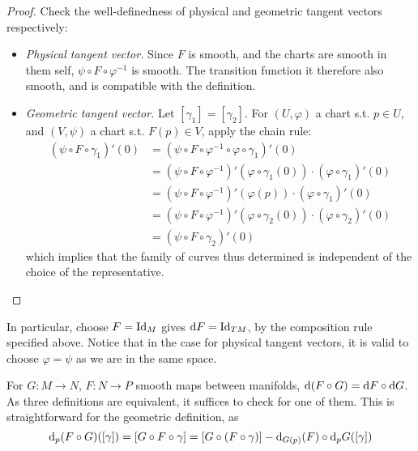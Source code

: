 \documentclass{article}
\begin{document}
\begin{proof}
    Check the well-definedness of physical and geometric tangent vectors respectively:
    \begin{itemize}
        \item \emph{Physical tangent vector.} Since $F$ is smooth, and the charts are smooth in them self, $\psi \circ F \circ \varphi^{-1}$ is smooth. The transition function it therefore also smooth, and is compatible with the definition.
        \item \emph{Geometric tangent vector.} Let $[\gamma_1] = [\gamma_2]$. For $(U, \varphi)$ a chart s.t. $p \in U$, and $(V, \psi)$ a chart s.t. $F(p) \in V$, apply the chain rule:
        \begin{align*}
            (\psi \circ F \circ \gamma_1)'(0)
            & = (\psi \circ F \circ \varphi^{-1} \circ \varphi \circ \gamma_1)'(0) \\
            & = (\psi \circ F \circ \varphi^{-1})'(\varphi \circ \gamma_1(0)) \cdot (\varphi \circ \gamma_1)'(0) \\
            & = (\psi \circ F \circ \varphi^{-1})'(\varphi(p)) \cdot (\varphi \circ \gamma_1)'(0) \\
            & = (\psi \circ F \circ \varphi^{-1})'(\varphi \circ \gamma_2(0)) \cdot (\varphi \circ \gamma_2)'(0) \\
            & = (\psi \circ F \circ \gamma_2)'(0)
        \end{align*}
        which implies that the family of curves thus determined is independent of the choice of the representative. 
    \end{itemize}
\end{proof}

\begin{remark}
    In particular, choose $F = \mathrm{Id}_M$ gives $\mathrm{d} F = \mathrm{Id}_{TM}$, by the composition rule specified above. Notice that in the case for physical tangent vectors, it is valid to choose $\varphi = \psi$ as we are in the same space.
\end{remark}

\begin{remark}
    For $G: M \to N$, $F : N \to P$ smooth maps between manifolds, $\mathrm{d} (F \circ G) = \mathrm{d} F \circ \mathrm{d} G$. As three definitions are equivalent, it suffices to check for one of them. This is straightforward for the geometric definition, as
    \[
        \mathrm{d}_p (F \circ G)([\gamma]) = [G \circ F \circ \gamma] = [G \circ (F \circ \gamma)] - \mathrm{d}_{G(p)}(F) \circ \mathrm{d}_pG([\gamma])
    \] 
\end{remark}
\end{document}
